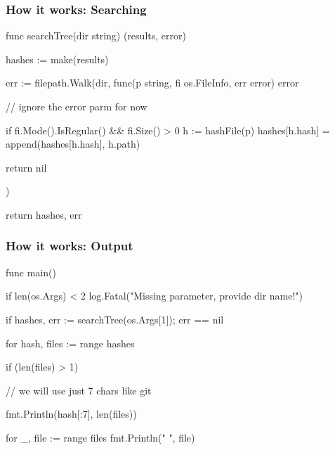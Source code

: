 \documentclass[compress,t,11pt]{beamer}
\begin{document}
\begin{frame}[fragile]
    \frametitle{How it works: Searching}
\begin{golang}
func searchTree(dir string) (results, error) {
	hashes := make(results)

	err := filepath.Walk(dir, func(p string, fi os.FileInfo,
                                   err error) error {

        // ignore the error parm for now

		if fi.Mode().IsRegular() && fi.Size() > 0 {
			h := hashFile(p)
			hashes[h.hash] = append(hashes[h.hash], h.path)
		}

		return nil
	})

	return hashes, err
}
\end{golang}
\end{frame}

\begin{frame}[fragile]
    \frametitle{How it works: Output}
\begin{golang}
func main() {
    if len(os.Args) < 2 {
        log.Fatal("Missing parameter, provide dir name!")
    }

    if hashes, err := searchTree(os.Args[1]); err == nil {
    	for hash, files := range hashes {
    		if (len(files) > 1) {
                // we will use just 7 chars like git

    			fmt.Println(hash[:7], len(files))

    			for _, file := range files {
    				fmt.Println("   ", file)
    			}
    		}
    	}
    }
}
\end{golang}
\end{frame}
\end{document}

